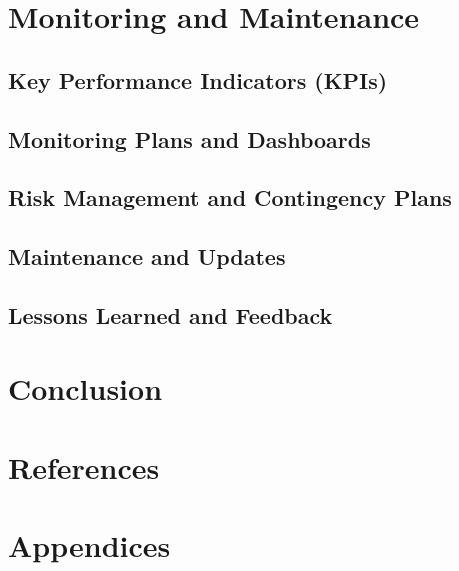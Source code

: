 \documentclass[11pt,a4paper]{article}
\begin{document}
\section{Monitoring and Maintenance}

\subsection{Key Performance Indicators (KPIs)}

\subsection{Monitoring Plans and Dashboards}

\subsection{Risk Management and Contingency Plans}

\subsection{Maintenance and Updates}

\subsection{Lessons Learned and Feedback}


\section{Conclusion}

\section{References}

\section{Appendices}
\end{document}
